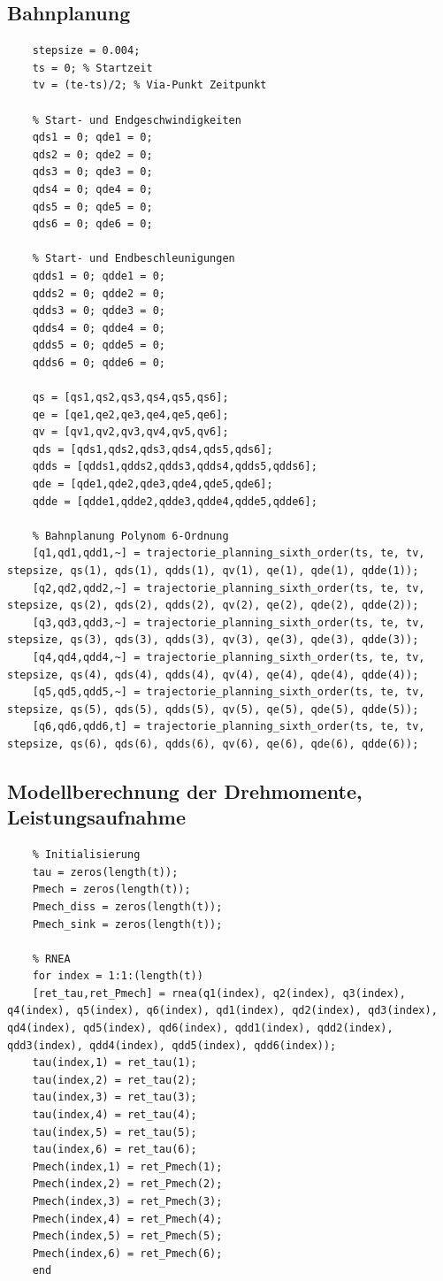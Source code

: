 \subsection*{Bahnplanung}
%
\begin{lstlisting}
	stepsize = 0.004;
	ts = 0; % Startzeit
	tv = (te-ts)/2; % Via-Punkt Zeitpunkt
	
	% Start- und Endgeschwindigkeiten
	qds1 = 0; qde1 = 0;
	qds2 = 0; qde2 = 0;
	qds3 = 0; qde3 = 0;
	qds4 = 0; qde4 = 0;
	qds5 = 0; qde5 = 0;
	qds6 = 0; qde6 = 0;
	
	% Start- und Endbeschleunigungen
	qdds1 = 0; qdde1 = 0;
	qdds2 = 0; qdde2 = 0;
	qdds3 = 0; qdde3 = 0;
	qdds4 = 0; qdde4 = 0;
	qdds5 = 0; qdde5 = 0;
	qdds6 = 0; qdde6 = 0;
	
	qs = [qs1,qs2,qs3,qs4,qs5,qs6];
	qe = [qe1,qe2,qe3,qe4,qe5,qe6];
	qv = [qv1,qv2,qv3,qv4,qv5,qv6];
	qds = [qds1,qds2,qds3,qds4,qds5,qds6];
	qdds = [qdds1,qdds2,qdds3,qdds4,qdds5,qdds6];
	qde = [qde1,qde2,qde3,qde4,qde5,qde6];
	qdde = [qdde1,qdde2,qdde3,qdde4,qdde5,qdde6];
	
	% Bahnplanung Polynom 6-Ordnung
	[q1,qd1,qdd1,~] = trajectorie_planning_sixth_order(ts, te, tv, stepsize, qs(1), qds(1), qdds(1), qv(1), qe(1), qde(1), qdde(1));
	[q2,qd2,qdd2,~] = trajectorie_planning_sixth_order(ts, te, tv, stepsize, qs(2), qds(2), qdds(2), qv(2), qe(2), qde(2), qdde(2));
	[q3,qd3,qdd3,~] = trajectorie_planning_sixth_order(ts, te, tv, stepsize, qs(3), qds(3), qdds(3), qv(3), qe(3), qde(3), qdde(3));
	[q4,qd4,qdd4,~] = trajectorie_planning_sixth_order(ts, te, tv, stepsize, qs(4), qds(4), qdds(4), qv(4), qe(4), qde(4), qdde(4));
	[q5,qd5,qdd5,~] = trajectorie_planning_sixth_order(ts, te, tv, stepsize, qs(5), qds(5), qdds(5), qv(5), qe(5), qde(5), qdde(5));
	[q6,qd6,qdd6,t] = trajectorie_planning_sixth_order(ts, te, tv, stepsize, qs(6), qds(6), qdds(6), qv(6), qe(6), qde(6), qdde(6));
\end{lstlisting}
%
\subsection*{Modellberechnung der Drehmomente, Leistungsaufnahme}
%
\begin{lstlisting}
	% Initialisierung
	tau = zeros(length(t));
	Pmech = zeros(length(t));
	Pmech_diss = zeros(length(t));
	Pmech_sink = zeros(length(t));
	
	% RNEA
	for index = 1:1:(length(t))
	[ret_tau,ret_Pmech] = rnea(q1(index), q2(index), q3(index), q4(index), q5(index), q6(index), qd1(index), qd2(index), qd3(index), qd4(index), qd5(index), qd6(index), qdd1(index), qdd2(index), qdd3(index), qdd4(index), qdd5(index), qdd6(index));
	tau(index,1) = ret_tau(1);
	tau(index,2) = ret_tau(2);
	tau(index,3) = ret_tau(3);
	tau(index,4) = ret_tau(4);
	tau(index,5) = ret_tau(5);
	tau(index,6) = ret_tau(6);
	Pmech(index,1) = ret_Pmech(1);
	Pmech(index,2) = ret_Pmech(2);
	Pmech(index,3) = ret_Pmech(3);
	Pmech(index,4) = ret_Pmech(4);
	Pmech(index,5) = ret_Pmech(5);
	Pmech(index,6) = ret_Pmech(6);
	end
\end{lstlisting}
%
